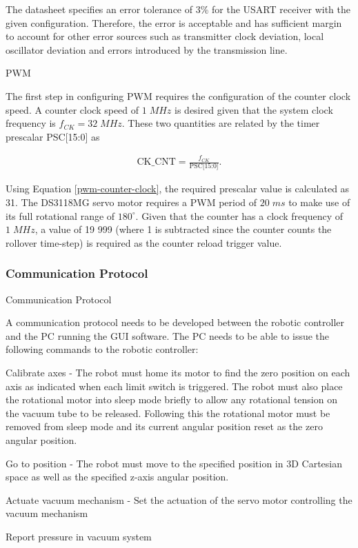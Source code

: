 The datasheet specifies an error tolerance of $3\%$ for the USART receiver with the given configuration. Therefore, the error is acceptable and has sufficient margin to account for other error sources such as transmitter clock deviation, local oscillator deviation and errors introduced by the transmission line.

PWM

The first step in configuring PWM requires the configuration of the counter clock speed. A counter clock speed of $1\;MHz$ is desired given that the system clock frequency is $f_{CK}=32\;MHz$. These two quantities are related by the timer prescalar PSC[15:0] as

\begin{align}
	\text{CK\_CNT}=\frac{f_{CK}}{\text{PSC[15:0]}}.
	\label{pwm-counter-clock}
\end{align}

Using Equation \ref{pwm-counter-clock}, the required prescalar value is calculated as 31. The DS3118MG servo motor requires a PWM period of $20\;ms$ to make use of its full rotational range of $180^{\circ}$. Given that the counter has a clock frequency of $1\;MHz$, a value of 19 999 (where 1 is subtracted since the counter counts the rollover time-step) is required as the counter reload trigger value.

\subsubsection{Communication Protocol}

Communication Protocol


A communication protocol needs to be developed between the robotic controller and the PC running the GUI software. The PC needs to be able to issue the following commands to the robotic controller:

\begin{compactitem}
	\item Calibrate axes - The robot must home its motor to find the zero position on each axis as indicated when each limit switch is triggered. The robot must also place the rotational motor into sleep mode briefly to allow any rotational tension on the vacuum tube to be released. Following this the rotational motor must be removed from sleep mode and its current angular position reset as the zero angular position. 
	\item Go to position - The robot must move to the specified position in 3D Cartesian space as well as the specified z-axis angular position.
	\item Actuate vacuum mechanism - Set the actuation of the servo motor controlling the vacuum mechanism
	\item Report pressure in vacuum system
\end{compactitem}

